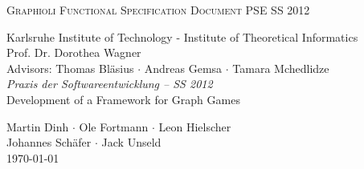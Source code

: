 \begin{titlepage}
\begin{center}
\fontsize{40}{50}\selectfont
        \vfill
        \textsc{Graphioli}
		\vfill
        \textsc{Functional Specification Document}
        \vfill
\Large
PSE SS 2012
  \vfill
 \newpage
 
 \null
 \vfill
 \fontsize{12}{16}\selectfont
 Karlsruhe Institute of Technology - Institute of Theoretical Informatics \\
 Prof. Dr. Dorothea Wagner \\
 \vspace{.5cm}
 Advisors: Thomas Bläsius $\cdot$ Andreas Gemsa $\cdot$ Tamara Mchedlidze \\
 
 \vspace{2cm}
 \Large
 \emph{Praxis der Softwareentwicklung -- SS 2012} \\
 Development of a Framework for Graph Games \\
  \medskip
  \vspace{2cm}
  
    Martin Dinh $\cdot$ Ole Fortmann $\cdot$ Leon Hielscher \\ Johannes Schäfer $\cdot$ Jack Unseld
  \vspace{2cm} \\
  \today
\end{center}

  \vfill

\end{titlepage}